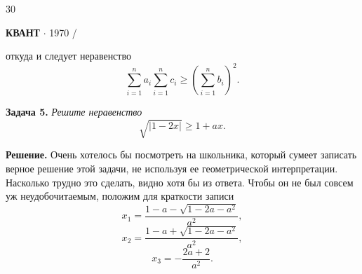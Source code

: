 {\begin{minipage}[b]{0.33333\textwidth}
\raggedright
{\large 30}
\end{minipage}%
\begin{minipage}[b]{0.33333\textwidth}
\centering
\textbf{КВАНТ} $\cdot$ \textsf{1970 \slash {}}
\end{minipage}%

\begin{multicols}{3}
откуда и следует неравенство \\
\[\sum_{i=1}^{n} a_i \sum_{i=1}^{n} c_i \geq (\sum_{i=1}^{n} b_i)^2.\] \par
\textbf{Задача 5.} \textsl{Решите неравенство}
\[\sqrt{|1 - 2x|} \geq 1 + ax.\] \par
\textbf{Решение.}  Очень хотелось бы посмотреть на школьника,
который сумеет записать верное решение этой задачи,
не используя ее геометрической интерпретации. Насколько
трудно это сделать, видно хотя бы из ответа. Чтобы он не
был совсем уж неудобочитаемым, положим для краткости записи\\
\[x_1 = \frac{1 - a - \sqrt{1 - 2a - a^2}}{a^2},\]
\[x_2 = \frac{1 - a + \sqrt{1 - 2a - a^2}}{a^2},\]
\[x_3 = -\frac{2a + 2}{a^2}.\]


\end{multicols}}
